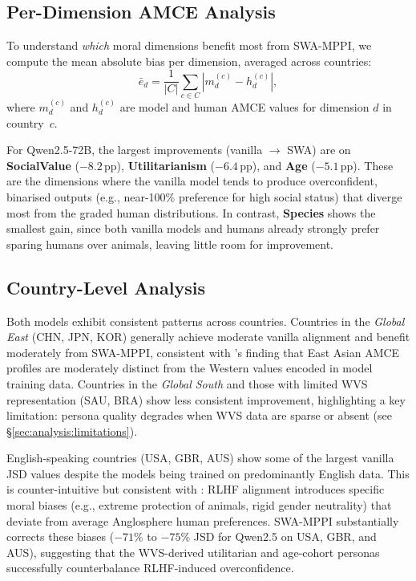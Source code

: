 \documentclass{article}
\begin{document}
\subsection{Per-Dimension AMCE Analysis}
\label{sec:results:amce}

To understand \emph{which} moral dimensions benefit most from SWA-MPPI, we compute
the mean absolute bias per dimension, averaged across countries:
\begin{equation}
    \bar{e}_d = \frac{1}{|C|}\sum_{c \in C} |m_d^{(c)} - h_d^{(c)}|,
    \label{eq:dimension_mae}
\end{equation}
where $m_d^{(c)}$ and $h_d^{(c)}$ are model and human AMCE values for dimension $d$
in country~$c$.

For Qwen2.5-72B, the largest improvements (vanilla $\to$ SWA) are on
\textbf{SocialValue} ($-8.2$\,pp), \textbf{Utilitarianism} ($-6.4$\,pp), and
\textbf{Age} ($-5.1$\,pp). These are the dimensions where the vanilla model tends
to produce overconfident, binarised outputs (e.g., near-100\% preference for high
social status) that diverge most from the graded human distributions. In contrast,
\textbf{Species} shows the smallest gain, since both vanilla models and humans
already strongly prefer sparing humans over animals, leaving little room for
improvement.

\subsection{Country-Level Analysis}
\label{sec:results:country}

Both models exhibit consistent patterns across countries. Countries in the
\emph{Global East} (CHN, JPN, KOR) generally achieve moderate vanilla alignment
and benefit moderately from SWA-MPPI, consistent with \citet{jin2025multitp}'s
finding that East Asian AMCE profiles are moderately distinct from the Western
values encoded in model training data. Countries in the \emph{Global South} and
those with limited WVS representation (SAU, BRA) show less consistent improvement,
highlighting a key limitation: persona quality degrades when WVS data are sparse
or absent (see \S\ref{sec:analysis:limitations}).

English-speaking countries (USA, GBR, AUS) show some of the largest vanilla JSD
values despite the models being trained on predominantly English data. This is
counter-intuitive but consistent with \citet{jin2025multitp}: RLHF alignment
introduces specific moral biases (e.g., extreme protection of animals, rigid
gender neutrality) that deviate from average Anglosphere human preferences.
SWA-MPPI substantially corrects these biases ($-71\%$ to $-75\%$ JSD for Qwen2.5
on USA, GBR, and AUS), suggesting that the WVS-derived utilitarian and age-cohort
personas successfully counterbalance RLHF-induced overconfidence.
\end{document}
